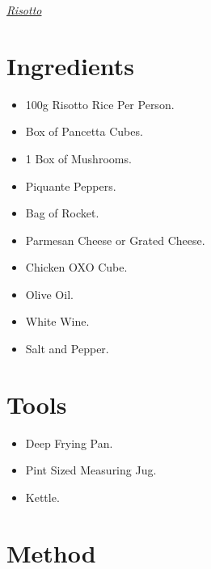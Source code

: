 \documentclass[a4paper,10pt, onecolumn]{article}
\begin{document}
   \centerline{\underline{\emph{\huge Risotto}}}
   \vspace{0.5cm}

\begin{multicols}{2}



\section*{Ingredients}

\begin{itemize}
\item 100g Risotto Rice Per Person.
\item Box of Pancetta Cubes.
\item 1 Box of Mushrooms.
\item Piquante Peppers.
\item Bag of Rocket.
\item Parmesan Cheese or Grated Cheese.
\item Chicken OXO Cube.
\item Olive Oil.
\item White Wine.
\item Salt and Pepper.
\end{itemize}

\columnbreak

\section*{Tools}
\begin{itemize}
\item Deep Frying Pan.
\item Pint Sized Measuring Jug.
\item Kettle.
\end{itemize}

\end{multicols}
\hrulefill
\section*{Method}
\end{document}
